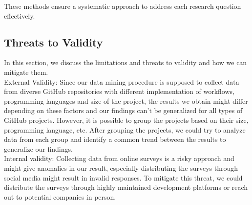 \documentclass[conference]{IEEEtran}
\begin{document}
These methods ensure a systematic approach to address each research question effectively.\\

\subsection{Threats to Validity}
In this section, we discuss the limitations and threats to
validity and how we can mitigate them.\\

External Validity: Since our data mining procedure is supposed to collect data from diverse GitHub repositories with different implementation of workflows, programming languages and size of the project, the results we obtain might differ depending on these factors and our findings can’t be generalized for all types of GitHub projects. However, it is possible to group the projects based on their size, programming language, etc. After grouping the projects, we could try to analyze data from each group and identify a common trend between the results to generalize our findings.\\

Internal validity: Collecting data from online surveys is a risky approach and might give anomalies in our result, especially distributing the surveys through social media might result in invalid responses. To mitigate this threat, we could distribute the surveys through highly maintained development platforms or reach out to potential companies in person. 
\end{document}
